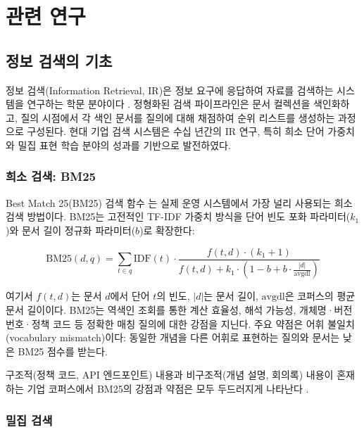 \chapter{관련 연구}
\label{chap:litreview_ko}

\section{정보 검색의 기초}
\label{sec:lit_ir_ko}

정보 검색(Information Retrieval, IR)은 정보 요구에 응답하여 자료를 검색하는 시스템을 연구하는 학문 분야이다 \citep{manning2008ir}. 정형화된 검색 파이프라인은 문서 컬렉션을 색인화하고, 질의 시점에서 각 색인 문서를 질의에 대해 채점하여 순위 리스트를 생성하는 과정으로 구성된다. 현대 기업 검색 시스템은 수십 년간의 IR 연구, 특히 희소 단어 가중치와 밀집 표현 학습 분야의 성과를 기반으로 발전하였다.

\subsection{희소 검색: BM25}

Best Match 25(BM25) 검색 함수 \citep{robertson1995okapi,robertson2009bm25}는 실제 운영 시스템에서 가장 널리 사용되는 희소 검색 방법이다. BM25는 고전적인 TF-IDF 가중치 방식을 단어 빈도 포화 파라미터($k_1$)와 문서 길이 정규화 파라미터($b$)로 확장한다:

\begin{equation}
    \text{BM25}(d, q) = \sum_{t \in q} \text{IDF}(t) \cdot \frac{f(t,d) \cdot (k_1 + 1)}{f(t,d) + k_1 \cdot \left(1 - b + b \cdot \frac{|d|}{\text{avgdl}}\right)}
    \label{eq:bm25_ko}
\end{equation}

여기서 $f(t,d)$는 문서 $d$에서 단어 $t$의 빈도, $|d|$는 문서 길이, $\text{avgdl}$은 코퍼스의 평균 문서 길이이다. BM25는 역색인 조회를 통한 계산 효율성, 해석 가능성, 개체명·버전 번호·정책 코드 등 정확한 매칭 질의에 대한 강점을 지닌다. 주요 약점은 어휘 불일치(vocabulary mismatch)이다: 동일한 개념을 다른 어휘로 표현하는 질의와 문서는 낮은 BM25 점수를 받는다.

구조적(정책 코드, API 엔드포인트) 내용과 비구조적(개념 설명, 회의록) 내용이 혼재하는 기업 코퍼스에서 BM25의 강점과 약점은 모두 두드러지게 나타난다 \citep{robertson2004understanding}.

\subsection{밀집 검색}

